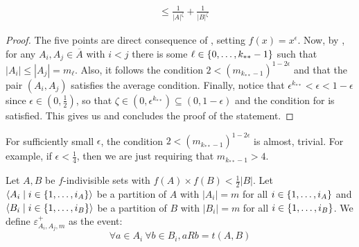 \begin{lemma}[Claim 4.10]
\begin{enumerate}
\[\begin{split}
                            &\leq \frac{1}{|A|^\zeta} + \frac{1}{|B|^\zeta}
                    \end{split}
                \]
        \end{enumerate}
        \begin{proof}
            The five points are direct consequence of ,
            setting $f(x) = x^\epsilon$.
            Now, by , for any $A_i, A_j \in \overline{A}$ with $i < j$
            there is some $\ell \in \{ 0, \dots, k_{**}-1 \}$ such that $|A_i| \leq |A_j| = m_\ell$.
            Also, it follows the condition $2 < (m_{k_{**}-1})^{1-2\epsilon}$ and 
            that the pair $(A_i,A_j)$ satisfies the average condition.
            Finally, notice that $\epsilon^{k_{**}} < \epsilon < 1 - \epsilon$ since $\epsilon \in (0, \frac{1}{2})$,
            so that $\zeta \in (0, \epsilon ^ {k_{**}}) \subseteq (0, 1 - \epsilon)$ and the condition for
             is satisfied.
            This gives us  and concludes the proof of the statement.
        \end{proof}
    \end{lemma}

    \begin{remark}
        For sufficiently small $\epsilon$, the condition $2 < (m_{k_{**}-1})^{1-2\epsilon}$ is almost, trivial.
        For example, if $\epsilon < \frac{1}{4}$, then we are just requiring that $m_{k_{**}-1} > 4$.
    \end{remark}

    \begin{definition}
        Let $A, B$ be $f$-indivisible sets with $f(A) \times f(B) < \frac{1}{2} |B|$.
        Let $\left< A_i \mid i \in \{ 1, \dots, i_A \} \right>$ be a partition of $A$ with $|A_i| = m$ for all
        $i \in \{ 1, \dots, i_A \}$ and $\left< B_i \mid i \in \{ 1, \dots, i_B \} \right>$ be a partition of
        $B$ with $|B_i| = m$ for all $i \in \{ 1, \dots, i_B \}$.
        We define $\varepsilon^+_{A_i,A_j,m}$ as the event:
        \[
            \forall a \in A_i \ \forall b \in B_i, a R b = t(A,B)
        \]
    \end{definition}

